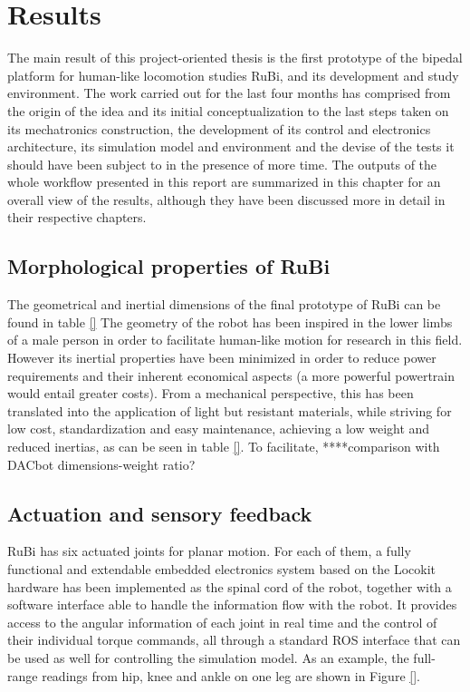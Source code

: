 \chapter{Results} %
\label{cha:results}
The main result of this project-oriented thesis is the first prototype of the bipedal platform for human-like locomotion studies RuBi, and its development and study environment.
The work carried out for the last four months has comprised from the origin of the idea and its initial conceptualization to the last steps taken on its mechatronics construction, the development of its control and electronics architecture, its simulation model and environment and the devise of the tests it should have been subject to in the presence of more time.
The outputs of the whole workflow presented in this report are summarized in this chapter for an overall view of the results, although they have been discussed more in detail in their respective chapters.


\section{Morphological properties of RuBi} %
\label{sec:rubi_mechanical_properties}
The geometrical and inertial dimensions of the final prototype of RuBi can be found in table \ref{}
The geometry of the robot has been inspired in the lower limbs of a male person in order to facilitate human-like motion for research in this field.
However its inertial properties have been minimized in order to reduce power requirements and their inherent economical aspects (a more powerful powertrain would entail greater costs).
From a mechanical perspective, this has been translated into the application of light but resistant materials, while striving for low cost, standardization and easy maintenance, achieving a low weight and reduced inertias, as can be seen in table \ref{}.
To facilitate, ****comparison with DACbot dimensions-weight ratio?



\section{Actuation and sensory feedback} %
\label{sec:actuation_and_sensory_feedback}
RuBi has six actuated joints for planar motion.
For each of them, a fully functional and extendable embedded electronics system based on the Locokit hardware has been implemented as the spinal cord of the robot, together with a software interface able to handle the information flow with the robot.
It provides access to the angular information of each joint in real time and the control of their individual torque commands, all through a standard ROS interface that can be used as well for controlling the simulation model.
As an example, the full-range readings from hip, knee and ankle on one leg are shown in Figure \ref{}.

